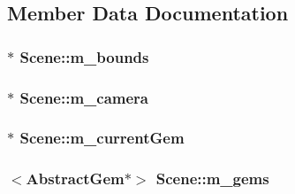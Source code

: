 \subsection{Member Data Documentation}
\hypertarget{class_scene_a62831eb6a67ce74ee608b4327bf069f3}{}
\subsubsection[{m\+\_\+bounds}]{$\ast$ Scene\+::m\+\_\+bounds\hspace{0.3cm}{\ttfamily [protected]}}\label{class_scene_a62831eb6a67ce74ee608b4327bf069f3}
\hypertarget{class_scene_ab37f5e133a5fe0803c3df42a4fcba7bf}{}
\subsubsection[{m\+\_\+camera}]{$\ast$ Scene\+::m\+\_\+camera\hspace{0.3cm}{\ttfamily [protected]}}\label{class_scene_ab37f5e133a5fe0803c3df42a4fcba7bf}
\hypertarget{class_scene_aff9d5a2212ba1b5813dc10177f0344cb}{}
\subsubsection[{m\+\_\+current\+Gem}]{$\ast$ Scene\+::m\+\_\+current\+Gem\hspace{0.3cm}{\ttfamily [protected]}}\label{class_scene_aff9d5a2212ba1b5813dc10177f0344cb}
\hypertarget{class_scene_a47d7b35730d7959a640339ed11d18866}{}
\subsubsection[{m\+\_\+gems}]{$<${\bf Abstract\+Gem}$\ast$$>$ Scene\+::m\+\_\+gems\hspace{0.3cm}{\ttfamily [protected]}}\label{class_scene_a47d7b35730d7959a640339ed11d18866}
\hypertarget{class_scene_a595ab554271bd87c4c73f0cce175ff81}{}
